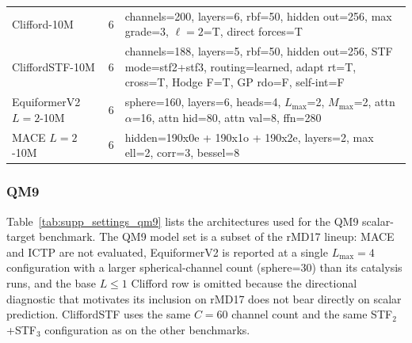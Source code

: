 \begin{table}[h]
{\begin{tabular}{l c l}
\hline
Clifford-10M       & 6 & channels=200, layers=6, rbf=50, hidden out=256, max grade=3, $\ell{=}2$=T, direct forces=T \\
CliffordSTF-10M    & 6 & channels=188, layers=5, rbf=50, hidden out=256, STF mode=stf2+stf3, routing=learned, adapt rt=T, cross=T, Hodge F=T, GP rdo=F, self-int=F \\
EquiformerV2 $L{=}2$-10M & 6 & sphere=160, layers=6, heads=4, $L_{\max}$=2, $M_{\max}$=2, attn $\alpha$=16, attn hid=80, attn val=8, ffn=280 \\
MACE $L{=}2$-10M   & 6 & hidden=190x0e + 190x1o + 190x2e, layers=2, max ell=2, corr=3, bessel=8 \\

\bottomrule
\end{tabular}%
}
\end{table}

\subsubsection{QM9}

Table~\ref{tab:supp_settings_qm9} lists the architectures used for the QM9 scalar-target benchmark. The QM9 model set is a subset of the rMD17 lineup: MACE and ICTP are not evaluated, EquiformerV2 is reported at a single $L_{\max}\!=\!4$ configuration with a larger spherical-channel count (sphere=$30$) than its catalysis runs, and the base $L\!\leq\!1$ Clifford row is omitted because the directional diagnostic that motivates its inclusion on rMD17 does not bear directly on scalar prediction. CliffordSTF uses the same $C\!=\!60$ channel count and the same STF$_2$+STF$_3$ configuration as on the other benchmarks.

